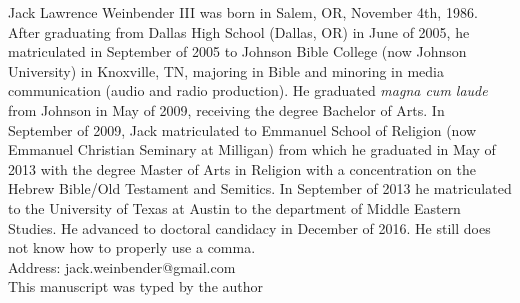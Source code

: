 
Jack Lawrence Weinbender III was born in Salem, OR, November 4th, 1986. After graduating from Dallas High School (Dallas, OR) in June of 2005, he matriculated in September of 2005 to Johnson Bible College (now Johnson University) in Knoxville, TN, majoring in Bible and minoring in media communication (audio and radio production). He graduated \emph{magna cum laude} from Johnson in May of 2009, receiving the degree Bachelor of Arts. In September of 2009, Jack matriculated to Emmanuel School of Religion (now Emmanuel Christian Seminary at Milligan) from which he graduated in May of 2013 with the degree Master of Arts in Religion with a concentration on the Hebrew Bible/Old Testament and Semitics. In September of 2013 he matriculated to the University of Texas at Austin to the department of Middle Eastern Studies. He advanced to doctoral candidacy in December of 2016. He still does not know how to properly use a comma.\\[36pt]


\noindent
Address: jack.weinbender@gmail.com\\[24pt]

\noindent
This manuscript was typed by the author